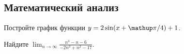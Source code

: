 \subsection*{Математический анализ}

\begin{problems}

\item
Постройте график функции\enspace
$y = 2 \sin(x + \piconst / 4) + 1$.

\item
Найдите\enspace
\( \displaystyle
    \lim_{n \to \infty}
        \frac{n^3 - n - 6}{-2 n^3 + n^2 - 17}
\).

\end{problems}

